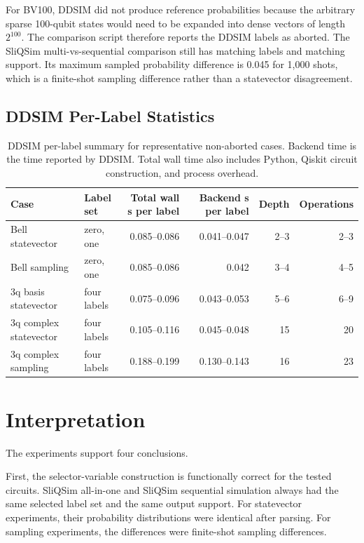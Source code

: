 \documentclass[sigconf,nonacm]{acmart}
\begin{document}
For BV100, DDSIM did not produce reference probabilities because the arbitrary sparse 100-qubit states would need to be expanded into dense vectors of length $2^{100}$. The comparison script therefore reports the DDSIM labels as aborted. The SliQSim multi-vs-sequential comparison still has matching labels and matching support. Its maximum sampled probability difference is 0.045 for 1,000 shots, which is a finite-shot sampling difference rather than a statevector disagreement.

\subsection{DDSIM Per-Label Statistics}
\begin{table}[t]
\centering
\caption{DDSIM per-label summary for representative non-aborted cases. Backend time is the time reported by DDSIM. Total wall time also includes Python, Qiskit circuit construction, and process overhead.}
\label{tab:ddsim}
\begin{tabular}{llrrrr}
\toprule
Case & Label set & Total wall s per label & Backend s per label & Depth & Operations \\
\midrule
Bell statevector & zero, one & 0.085--0.086 & 0.041--0.047 & 2--3 & 2--3 \\
Bell sampling & zero, one & 0.085--0.086 & 0.042 & 3--4 & 4--5 \\
3q basis statevector & four labels & 0.075--0.096 & 0.043--0.053 & 5--6 & 6--9 \\
3q complex statevector & four labels & 0.105--0.116 & 0.045--0.048 & 15 & 20 \\
3q complex sampling & four labels & 0.188--0.199 & 0.130--0.143 & 16 & 23 \\
\bottomrule
\end{tabular}
\end{table}

\section{Interpretation}
The experiments support four conclusions.

First, the selector-variable construction is functionally correct for the tested circuits. SliQSim all-in-one and SliQSim sequential simulation always had the same selected label set and the same output support. For statevector experiments, their probability distributions were identical after parsing. For sampling experiments, the differences were finite-shot sampling differences.
\end{document}
